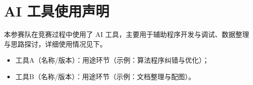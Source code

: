 \documentclass[12pt, a4paper]{ctexart}
\begin{document}












\section*{AI 工具使用声明}
本参赛队在竞赛过程中使用了 AI 工具，主要用于辅助程序开发与调试、数据整理与思路探讨，详细使用情况见下。

\begin{itemize}[leftmargin=2em, itemsep=2pt, topsep=3pt]
  \item 工具A（名称/版本）：用途环节（示例：算法程序纠错与优化）；
  \item 工具B（名称/版本）：用途环节（示例：文档整理与配图）。
\end{itemize}

\clearpage



\clearpage

\end{document}
